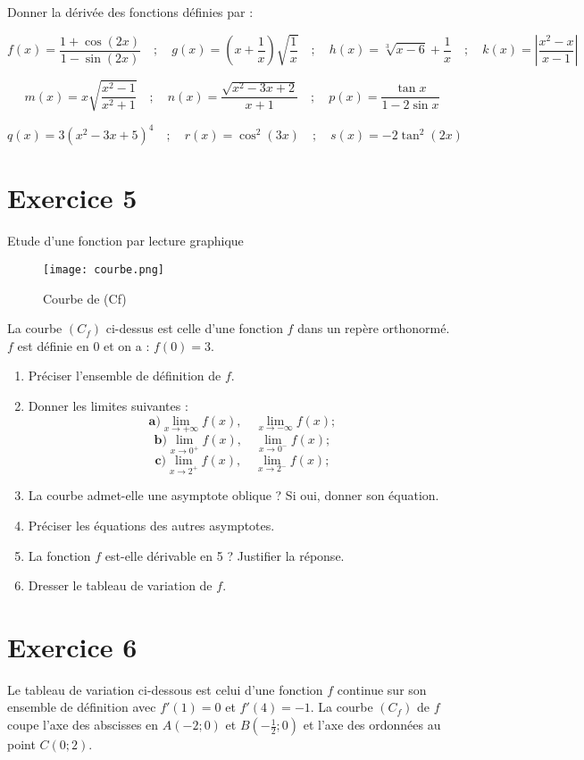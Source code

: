 \documentclass[12pt]{article}
\begin{document}
Donner la dérivée des fonctions définies par :

\[
f(x) = \frac{1 + \cos(2x)}{1 - \sin(2x)} \quad ; \quad
g(x) = \left( x + \frac{1}{x} \right) \sqrt{\frac{1}{x}} \quad ; \quad
h(x) = \sqrt[3]{x - 6} + \frac{1}{x} \quad ; \quad
k(x) = \left| \frac{x^2 - x}{x - 1} \right|
\]

\[
m(x) = x \sqrt{\frac{x^2 - 1}{x^2 + 1}} \quad ; \quad
n(x) = \frac{\sqrt{x^2 - 3x + 2}}{x + 1} \quad ; \quad
p(x) = \frac{\tan x}{1 - 2 \sin x}
\]

\[
q(x) = 3 \left( x^2 - 3x + 5 \right)^4 \quad ; \quad
r(x) = \cos^2(3x) \quad ; \quad
s(x) = -2 \tan^2(2x)
\]
\newpage
\section*{Exercice 5}
Etude d'une fonction par lecture graphique
\begin{figure}[h]
\centering
\texttt{[image: courbe.png]}
\caption{Courbe de (Cf)}
\label{fig:monimage}
\end{figure}
La courbe $(C_f)$ ci-dessus est celle d'une fonction $f$ dans un repère orthonormé. $f$ est définie en 0 et on a : $f(0) = 3$.

\begin{enumerate}
    \item Préciser l'ensemble de définition de $f$.
    \item Donner les limites suivantes :
    \[
    \textbf{a)} \lim_{x \to +\infty} f(x), \quad \lim_{x \to -\infty} f(x) ;
    \]
    \[
    \textbf{b)} \lim_{x \to 0^+} f(x), \quad \lim_{x \to 0^-} f(x) ;
    \]
    \[
    \textbf{c)} \lim_{x \to 2^+} f(x), \quad \lim_{x \to 2^-} f(x) ;
    \]
    \item La courbe admet-elle une asymptote oblique ? Si oui, donner son équation.
    \item Préciser les équations des autres asymptotes.
    \item La fonction $f$ est-elle dérivable en 5 ? Justifier la réponse.
    \item Dresser le tableau de variation de $f$.
\end{enumerate}

\section*{Exercice 6}

Le tableau de variation ci-dessous est celui d'une fonction $f$ continue sur son ensemble de définition avec $f'(1) = 0$ et $f'(4) = -1$. La courbe $(C_f)$ de $f$ coupe l'axe des abscisses en $A(-2;0)$ et $B\left(-\frac{1}{2};0\right)$ et l'axe des ordonnées au point $C(0;2)$.
\end{document}
